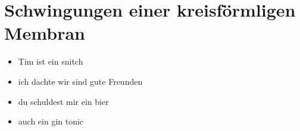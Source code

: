 %
%
%
\chapter{Schwingungen einer kreisförmligen Membran\label{chapter:kreismembran}}
\begin{refsection}
\begin{itemize}
\item
Tim ist ein snitch
\item
ich dachte wir sind gute Freunden
\item
du schuldest mir ein bier
\item 
auch ein gin tonic
\end{itemize}






\printbibliography[heading=subbibliography]
\end{refsection}
